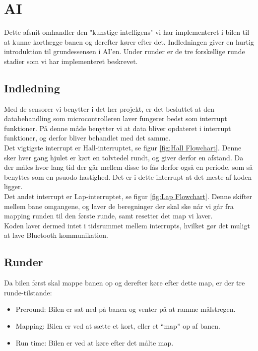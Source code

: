 \section{AI}
Dette afsnit omhandler den "kunstige intelligens" vi har implementeret i bilen til at kunne kortlægge banen og derefter kører efter det. Indledningen giver en hurtig introduktion til grundessensen i AI'en. Under runder er de tre forskellige runde stadier som vi har implementeret beskrevet.

\subsection{Indledning}
Med de sensorer vi benytter i det her projekt, er det besluttet at den databehandling som microcontrolleren laver fungerer bedst som interrupt funktioner. På denne måde benytter vi at data bliver opdateret i interrupt funktioner, og derfor bliver behandlet med det samme.
\\

Det vigtigste interrupt er Hall-interruptet, se figur \ref{fig:Hall Flowchart}. Denne sker hver gang hjulet er kørt en tolvtedel rundt, og giver derfor en afstand. Da der måles hvor lang tid der går mellem disse to fås derfor også en periode, som så benyttes som en psuodo hastighed. Det er i dette interrupt at det meste af koden ligger.
\\

Det andet interrupt er Lap-interruptet, se figur \ref{fig:Lap Flowchart}. Denne skifter mellem bane omgangene, og laver de beregninger der skal ske når vi går fra mapping runden til den første runde, samt resetter det map vi laver.
\\

Koden laver dermed intet  i tidsrummet mellem interrupts, hvilket gør det muligt at lave Bluetooth kommunikation.

\subsection{Runder}

Da bilen først skal mappe banen op og derefter køre efter dette map, er der tre runde-tilstande:

\begin{itemize}
\item Preround: Bilen er sat ned på banen og venter på at ramme målstregen.
\item Mapping: Bilen er ved at sætte et kort, eller et ``map'' op af banen.
\item Run time: Bilen er ved at køre efter det målte map.
\end{itemize}

